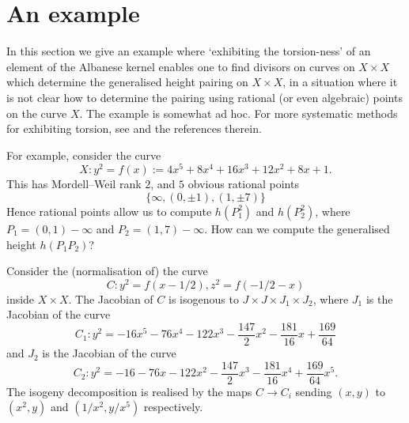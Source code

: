 \documentclass[11pt]{amsart}
\def\Aut{\mathrm{Aut}}
\theoremstyle{plain}
\newtheorem{lemma}{Lemma}
\theoremstyle{definition}
\newcommand{\Jac}{\mathrm{Jac}}
\begin{document}
\section{An example}\label{sec:example}
In this section we give an example where `exhibiting the torsion-ness' of an element of the Albanese kernel enables one to find divisors on curves on $X\times X$ which determine the generalised height pairing on $X\times X$, in a situation where it is not clear how to determine the pairing using rational (or even algebraic) points on the curve $X$. The example is somewhat ad hoc. For more systematic methods for exhibiting torsion, see \cite{GL23} and the references therein.
%
%

For example, consider the curve
\[
X:y^2 =f(x):=4x^5 + 8x^4 + 16x^3 + 12x^2 + 8x + 1.
\]
This has Mordell--Weil rank $2$, and $5$ obvious rational points
\[
\{ \infty ,(0,\pm 1),(1,\pm 7)\}
\]
Hence rational points allow us to compute $h(P_1 ^2 )$ and $h(P_2 ^2 )$, where $P_1 =(0,1)-\infty $ and $P_2 =(1,7)-\infty $.
How can we compute the generalised height $h(P_1 P_2 )$?

Consider the (normalisation of) the curve
\[
C:y^2 =f(x-1/2),z^2 =f(-1/2-x)
\]
inside $X\times X$. The Jacobian of $C$ is isogenous to $J\times J\times J_1 \times J_2 $, where $J_1 $ is the Jacobian of the curve 
\[
C_1 :y^2 =-16x^5 - 76x^4 - 122x^3 - \frac{147}{2}x^2 - \frac{181}{16}x + \frac{169}{64}
\]
and $J_2$ is the Jacobian of the curve
\[
C_2 :y^2 =-16 - 76x - 122x^2 - \frac{147}{2}x^3 - \frac{181}{16}x^4 + \frac{169}{64}x^5 .
\]
The isogeny decomposition is realised by the maps $C\to C_i $ sending $(x,y)$ to $(x^2 ,y)$ and $(1/x^2 ,y/x^5 )$ respectively.
\end{document}
